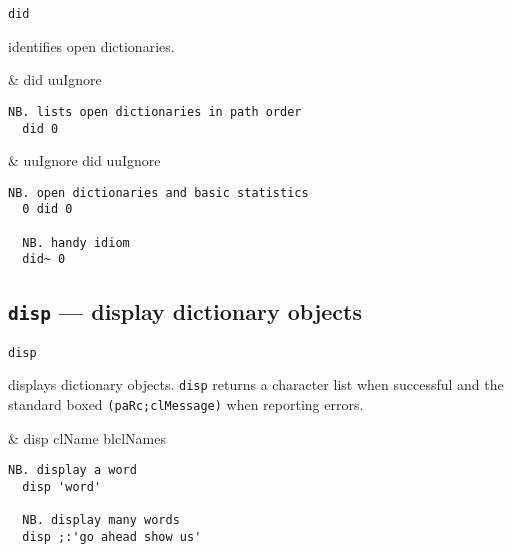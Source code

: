 \hypertarget{il:did}{\texttt{did}} identifies open dictionaries. 

\begin{wordhead}
\monad & did uuIgnore \\
\end{wordhead}
\begin{lstlisting}[frame=single,framerule=0pt]
  NB. lists open dictionaries in path order 
  did 0 
\end{lstlisting}

\begin{wordhead}
\dyad & uuIgnore did uuIgnore \\
\end{wordhead}
\begin{lstlisting}[frame=single,framerule=0pt]
  NB. open dictionaries and basic statistics 
  0 did 0  

  NB. handy idiom 
  did~ 0    
\end{lstlisting}

\subsection{\texttt{disp} --- display dictionary objects}\label{ss:disp} 

\hypertarget{il:disp}{\texttt{disp}} displays dictionary objects. \texttt{disp} returns a character 
list when successful and the standard boxed \verb|(paRc;clMessage)| when reporting errors. 

\begin{wordhead}
\monad & disp clName \argsep blclNames \\
\end{wordhead}
\begin{lstlisting}[frame=single,framerule=0pt]
  NB. display a word 
  disp 'word'     

  NB. display many words 
  disp ;:'go ahead show us' 
\end{lstlisting}

